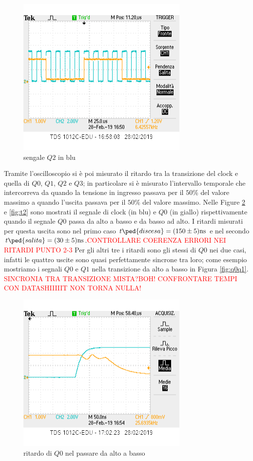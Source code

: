 \documentclass[10pt,a4paper]{article}
\begin{document}
\begin{figure}[h]
			\centering
			\includegraphics[scale=0.85]{1ottavo}
			\caption{sengale $Q2$ in blu}
			\label{fig:plh}
\end{figure}
Tramite l'oscilloscopio si è poi misurato il ritardo tra la transizione del clock e quella di $Q0$, $Q1$, $Q2$ e $Q3$; in particolare si è misurato l'intervallo temporale che intercorreva da quando la tensione in ingresso passava per il $50\%$ del valore massimo a quando l'uscita passava per  il $50\%$ del valore massimo. Nelle Figure \ref{fig:t1} e \ref{fig:t2} sono mostrati il segnale di clock (in blu) e $Q0$ (in giallo) rispettivamente quando il segnale  $Q0$ passa da alto a basso e da basso ad alto. I ritardi misurati per questa uscita 
sono nel primo caso $t\ped{discesa} = (150 \pm 5)\si{\nano\second}$ e nel secondo  $t\ped{salita} = (30 \pm 5)\si{\nano\second}$.\textcolor{red}{CONTROLLARE COERENZA ERRORI NEI RITARDI PUNTO 2-3}
Per gli altri tre i ritardi sono gli stessi di $Q0$  nei due casi, infatti le quattro uscite sono quasi perfettamente sincrone tra loro; come esempio  mostriamo  i segnali $Q0$ e $Q1$ nella transizione da alto a basso in Figura \ref{fig:q0q1}.
\textcolor{red}{SINCRONIA TRA TRANSIZIONE MISTA?BOH!}
\textcolor{red}{CONFRONTARE TEMPI CON DATASHIIIIIT NON TORNA NULLA!}
\begin{figure}[h]
			\centering
			\includegraphics[scale=0.85]{tcounter}
			\caption{ritardo di $Q0$ nel passare da alto a basso}
			\label{fig:t1}
\end{figure}
\end{document}

